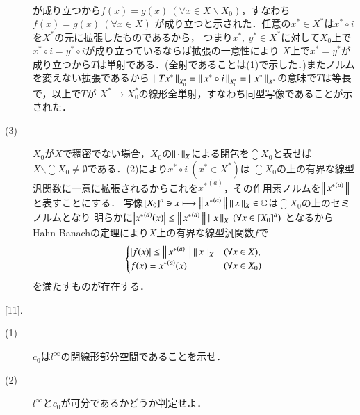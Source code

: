 \begin{prf}
\begin{description}
\begin{align}
		\end{align}
		が成り立つから$f(x) = g(x)\ (\forall x \in X \backslash X_0)$，すなわち$f(x) = g(x)\ (\forall x \in X)$
		が成り立つと示された．任意の$x^* \in X^*$は$x^* \circ i$を$X^*$の元に拡張したものであるから，
		つまり$x^*,\ y^* \in X^*$に対して$X_0$上で$x^* \circ i = y^* \circ i$が成り立っているならば拡張の一意性により
		$X$上で$x^* = y^*$が成り立つから$T$は単射である．(全射であることは(1)で示した．)またノルムを変えない拡張であるから
		$\left\|\, T x^*\, \right\|_{X_0^*} = \left\|\, x^* \circ i\, \right\|_{X_0^*} = \left\|\, x^*\, \right\|_{X^*}$の意味で$T$は等長で，以上で$T$が
		$X^* \longrightarrow X_0^*$の線形全単射，すなわち同型写像であることが示された．
	\item[(3)] $X_0$が$X$で稠密でない場合，$X_0$の$\left\|\, \cdot\, \right\|_{X}$による閉包を$\closure{X_0}$と表せば
		$X \backslash \closure{X_0} \neq \emptyset$である．(2)により$x^* \circ i\ (x^* \in X^*)$は
		$\closure{X_0}$の上の有界な線型汎関数に一意に拡張されるからこれを${x^*}^{(a)}$，その作用素ノルムを$\left\|\, {x^*}^{(a)}\, \right\|_{}$と表すことにする．
		写像$\left[X_0\right]^a \ni x \longmapsto \left\|\, {x^*}^{(a)}\, \right\|_{} \left\|\, x\, \right\|_{X} \in \mathbb{C}$は$\closure{X_0}$の上のセミノルムとなり
		明らかに$\left| {x^*}^{(a)}(x) \right| \leq \left\|\, {x^*}^{(a)}\, \right\|_{} \left\|\, x\, \right\|_{X}\ (\forall x \in \left[X_0\right]^a)$
		となるからHahn-Banachの定理により$X$上の有界な線型汎関数$f$で
		\begin{align}
			\begin{cases}
				|f (x)| \leq  \left\|\, {x^*}^{(a)}\, \right\|_{} \left\|\, x\, \right\|_{X} & (\forall x \in X), \\
				f(x) = {x^*}^{(a)}(x) & (\forall x \in X_0)
			\end{cases}
		\end{align}
		を満たすものが存在する．
\end{description}
\end{prf}

[11].\ 
	\begin{description}
		\item[(1)] $c_0$は$l^{\infty}$の閉線形部分空間であることを示せ．
		\item[(2)] $l^{\infty}$と$c_0$が可分であるかどうか判定せよ．
	\end{description}
	
